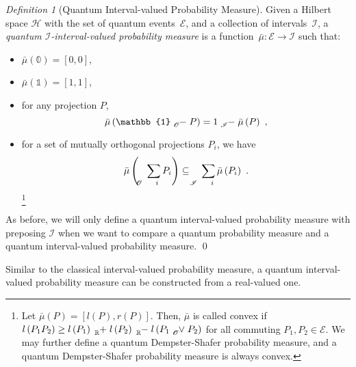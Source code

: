 \documentclass{article}
\theoremstyle{remark}
\newtheorem{definition}{Definition}
\newcommand{\events}{\ensuremath{\mathcal{E}}}
\newcommand{\Hilb}{\mathcal{H}}
\begin{document}
\begin{definition}[Quantum Interval-valued Probability Measure]\label{def:QuantumInterval-valuedProbability}
Given a Hilbert space $\Hilb$ with the set of quantum events~$\events$,
and a collection of intervals~$\mathscr{I}$, a \emph{quantum $\mathscr{I}$-interval-valued
probability measure} is a function~$\bar{\mu}:\events\rightarrow\mathscr{I}$
such that: 
\begin{itemize}
\item $\bar{\mu}(\mathbb{0})=\left[0,0\right]$, 
\item $\bar{\mu}(\mathbb{1})=\left[1,1\right]$, 
\item for any projection $P$, 
\begin{equation}
\bar{\mu}\left(\mathbb{1}\tensor*[_{\mathscr{O}}]{-}{}P\right)=1\tensor*[_{\mathscr{I}}]{-}{}\bar{\mu}\left(P\right)\textrm{ ,}\label{eq:QuantumInterval-valuedProbability-Complement}
\end{equation}
\item for a set of mutually orthogonal projections $P_{i}$, we have 
\begin{equation}
\bar{\mu}\left(\tensor*[_{\mathscr{O}}]{\sum}{_{i}}P_{i}\right)\subseteq\tensor*[_{\mathscr{I}}]{\sum}{_{i}}\bar{\mu}\left(P_{i}\right)\textrm{ .}\label{eq:QuantumInterval-valuedProbability-Inclusion}
\end{equation}
\footnote{Let $\bar{\mu}\left(P\right)=\left[l\left(P\right),r\left(P\right)\right]$.
Then, $\bar{\mu}$ is called convex if $l\left(P_{1}P_{2}\right)\ge l\left(P_{1}\right)\tensor*[_{\mathbb{R}}]{+}{}l\left(P_{2}\right)\tensor*[_{\mathbb{R}}]{-}{}l\left(P_{1}\tensor*[_{\mathscr{O}}]{\vee}{}P_{2}\right)$
for all commuting $P_{1},P_{2}\in\events$. We may further define
a quantum Dempster-Shafer probability measure, and a quantum Dempster-Shafer
probability measure is always convex.}
\end{itemize}
As before, we will only define a quantum interval-valued probability
measure with preposing $\mathscr{I}$ when we want to compare a quantum
probability measure and a quantum interval-valued probability measure.
\qed\end{definition}

Similar to the classical interval-valued probability measure, a quantum
interval-valued probability measure can be constructed from a real-valued
one. 
\end{document}
